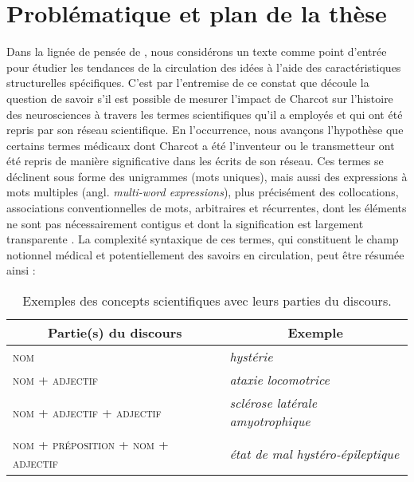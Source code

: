 \section{Problématique et plan de la thèse}
Dans la lignée de pensée de \citet{milia2023}, nous considérons un texte comme point d'entrée pour étudier les tendances de la circulation des idées à l'aide des caractéristiques structurelles spécifiques. C'est par l'entremise de ce constat que découle la question de savoir s'il est possible de mesurer l'impact de Charcot sur l'histoire des neurosciences à travers les termes scientifiques qu'il a employés et qui ont été repris par son réseau scientifique. En l'occurrence, nous avançons l'hypothèse que certains termes médicaux dont Charcot a été l'inventeur ou le transmetteur ont été repris de manière significative dans les écrits de son réseau. Ces termes se déclinent sous forme des unigrammes (mots uniques), mais aussi des expressions à mots multiples (angl. \textit{multi-word expressions}), plus précisément des collocations, \og{}associations conventionnelles de mots, arbitraires et récurrentes, dont les éléments ne sont pas nécessairement contigus et dont la signification est largement transparente\fg{} \citep[p. 96]{nerima2006}. La complexité syntaxique de ces termes, qui constituent le champ notionnel médical et potentiellement des savoirs en circulation, peut être résumée ainsi :
\begin{table}[h]
	\centering
	\begin{tabular}{l|l}
		\multicolumn{1}{c|}{Partie(s) du discours} & \multicolumn{1}{c}{Exemple} \\
		\hline
		\textsc{nom} & \textit{hystérie}\\
		\textsc{nom + adjectif} & \textit{ataxie locomotrice}\\
		\textsc{nom + adjectif + adjectif} & \textit{sclérose latérale amyotrophique}\\
		\textsc{nom + préposition + nom + adjectif} & \textit{état de mal hystéro-épileptique}
	\end{tabular}
	\caption{Exemples des concepts scientifiques avec leurs parties du discours.}
\end{table}

